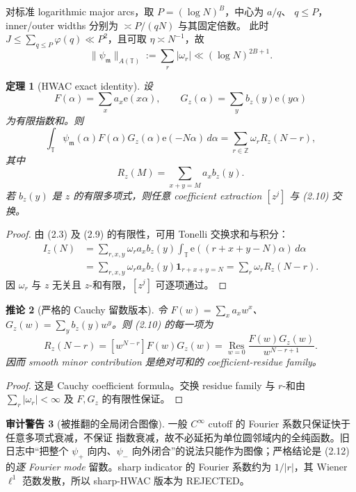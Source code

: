\documentclass[11pt,a4paper]{ctexart}
\newtheorem{theorem}{定理}[section]
\newtheorem{corollary}[theorem]{推论}
\theoremstyle{definition}
\newtheorem{warning}[theorem]{审计警告}
\newcommand{\T}{\mathbb T}
\newcommand{\e}{\mathrm e}
\newcommand{\1}{\mathbf 1}
\newcommand{\Res}{\operatorname*{Res}}
\newcommand{\REJECTED}{\textcolor{purple!75!black}{\textsf{REJECTED}}}
\begin{document}
对标准 logarithmic major arcs，取 $P=(\log N)^B$，中心为 $a/q$、
$q\le P$，inner/outer widths 分别为 $\asymp P/(qN)$ 与其固定倍数。
此时 $J\le\sum_{q\le P}\varphi(q)\ll P^2$，且可取 $\eta\asymp N^{-1}$，故
\[
\|\psi_{\mathfrak m}\|_{A(\T)}
:=\sum_r|\omega_r|\ll(\log N)^{2B+1}.                  \tag{2.8}
\]

\begin{theorem}[HWAC exact identity]
设
\[
F(\alpha)=\sum_xa_x\e(x\alpha),\qquad
G_z(\alpha)=\sum_yb_z(y)\e(y\alpha)                    \tag{2.9}
\]
为有限指数和。则
\[
\boxed{
\int_\T\psi_{\mathfrak m}(\alpha)F(\alpha)G_z(\alpha)
\e(-N\alpha)\,d\alpha
=\sum_{r\in\mathbb Z}\omega_rR_z(N-r),}               \tag{2.10}
\]
其中
\[
R_z(M)=\sum_{x+y=M}a_xb_z(y).                            \tag{2.11}
\]
若 $b_z(y)$ 是 $z$ 的有限多项式，则任意 coefficient extraction $[z^j]$
与 (2.10) 交换。
\end{theorem}

\begin{proof}
由 (2.3) 及 (2.9) 的有限性，可用 Tonelli 交换求和与积分：
\begin{align*}
I_z(N)
&=\sum_{r,x,y}\omega_ra_xb_z(y)
  \int_\T\e((r+x+y-N)\alpha)\,d\alpha\\
&=\sum_{r,x,y}\omega_ra_xb_z(y)\1_{r+x+y=N}
=\sum_r\omega_rR_z(N-r).
\end{align*}
因 $\omega_r$ 与 $z$ 无关且 $z$-和有限，$[z^j]$ 可逐项通过。
\end{proof}

\begin{corollary}[严格的 Cauchy 留数版本]
令 $F(w)=\sum_xa_xw^x$、$G_z(w)=\sum_yb_z(y)w^y$。则 (2.10) 的每一项为
\[
R_z(N-r)=[w^{N-r}]F(w)G_z(w)
=\Res_{w=0}\frac{F(w)G_z(w)}{w^{N-r+1}}.                \tag{2.12}
\]
因而 smooth minor contribution 是绝对可和的 coefficient-residue family。
\end{corollary}

\begin{proof}
这是 Cauchy coefficient formula。交换 residue family 与 $r$-和由
$\sum_r|\omega_r|<\infty$ 及 $F,G_z$ 的有限性保证。
\end{proof}

\begin{warning}[被推翻的全局闭合图像]
\sloppy
一般 $C^\infty$ cutoff 的 Fourier 系数只保证快于任意多项式衰减，不保证
指数衰减，故不必延拓为单位圆邻域内的全纯函数。旧日志中“把整个
$\psi_+$ 向内、$\psi_-$ 向外闭合”的说法只能作为图像；严格结论是
(2.12) 的\emph{逐 Fourier mode} 留数。sharp indicator 的 Fourier 系数约为
$1/|r|$，其 Wiener $\ell^1$ 范数发散，所以 sharp-HWAC 版本为 \REJECTED。
\end{warning}
\end{document}

